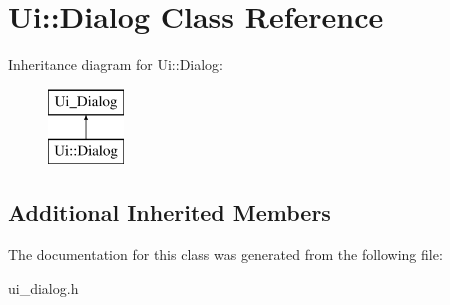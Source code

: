 \hypertarget{class_ui_1_1_dialog}{}\section{Ui\+:\+:Dialog Class Reference}
\label{class_ui_1_1_dialog}
Inheritance diagram for Ui\+:\+:Dialog\+:\begin{figure}[H]
\begin{center}
\leavevmode
\includegraphics[height=2.000000cm]{class_ui_1_1_dialog}
\end{center}
\end{figure}
\subsection*{Additional Inherited Members}


The documentation for this class was generated from the following file\+:\begin{DoxyCompactItemize}
\item 
ui\+\_\+dialog.\+h\end{DoxyCompactItemize}
